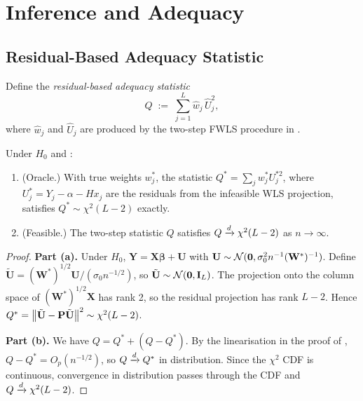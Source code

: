 \section{Inference and Adequacy}
\label{sec:test}

\subsection{Residual-Based Adequacy Statistic}

Define the \emph{residual-based adequacy statistic}
\begin{equation}
    Q \;:=\; \sum_{j=1}^{L} \hat w_j \,\hat U_j^2,
    \label{eq:Q-stat}
\end{equation}
where $\hat w_j$ and $\hat U_j$ are produced by the two-step FWLS procedure in
.

\begin{theorem}
\label{thm:null-chi2}
Under $H_0$ and :
\begin{enumerate}[label=(\alph*)]
    \item \textup{(Oracle.)}  With true weights $w_j^*$, the statistic
    $Q^* = \sum_j w_j^* U_j^{*2}$, where $U_j^* = Y_j - \alpha - H x_j$
    are the residuals from the infeasible WLS projection,
    satisfies $Q^* \sim \chi^2(L-2)$ exactly.
    \item \textup{(Feasible.)}  The two-step statistic $Q$ satisfies
    $Q \xrightarrow{d} \chi^2(L-2)$ as $n \to \infty$.
\end{enumerate}
\end{theorem}

\begin{proof}
\textbf{Part (a).}  Under $H_0$, $\mathbf{Y} = \mathbf{X}\boldsymbol\beta +
\mathbf{U}$ with $\mathbf{U} \sim \mathcal{N}(\mathbf{0}, \sigma_0^2 n^{-1}
(\mathbf{W}^*)^{-1})$.  Define $\tilde{\mathbf{U}} =
(\mathbf{W}^*)^{1/2}\mathbf{U}/(\sigma_0 n^{-1/2})$, so $\tilde{\mathbf{U}}
\sim \mathcal{N}(\mathbf{0}, \mathbf{I}_L)$.  The projection onto the column
space of $(\mathbf{W}^*)^{1/2}\mathbf{X}$ has rank 2, so the residual
projection has rank $L-2$.  Hence $Q^* = \left\|\tilde{\mathbf{U}} -
\mathbf{P}\tilde{\mathbf{U}}\right\|^2 \sim \chi^2(L-2)$.

\textbf{Part (b).}  We have $Q = Q^* + (Q - Q^*)$.  By the linearisation
in the proof of , $Q - Q^* = O_p(n^{-1/2})$,
so $Q \xrightarrow{d} Q^*$ in distribution.  Since the $\chi^2$ CDF is continuous,
convergence in distribution passes through the CDF and $Q \xrightarrow{d} \chi^2(L-2)$.
\end{proof}

